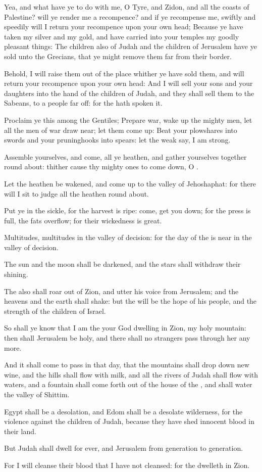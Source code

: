 \verse Yea, and what have ye to do with me, O Tyre, and Zidon, and all the coasts of Palestine? will ye render me a recompence? and if ye recompense me, swiftly and speedily will I return your recompence upon your own head; \verse Because ye have taken my silver and my gold, and have carried into your temples my goodly pleasant things: \verse The children also of Judah and the children of Jerusalem have ye sold unto the Grecians, that ye might remove them far from their border.

\verse Behold, I will raise them out of the place whither ye have sold them, and will return your recompence upon your own head: \verse And I will sell your sons and your daughters into the hand of the children of Judah, and they shall sell them to the Sabeans, to a people far off: for the \LORD hath spoken it.

\verse Proclaim ye this among the Gentiles; Prepare war, wake up the mighty men, let all the men of war draw near; let them come up: \verse Beat your plowshares into swords and your pruninghooks into spears: let the weak say, I am strong.

\verse Assemble yourselves, and come, all ye heathen, and gather yourselves together round about: thither cause thy mighty ones to come down, O \LORD.

\verse Let the heathen be wakened, and come up to the valley of Jehoshaphat: for there will I sit to judge all the heathen round about.

\verse Put ye in the sickle, for the harvest is ripe: come, get you down; for the press is full, the fats overflow; for their wickedness is great.

\verse Multitudes, multitudes in the valley of decision: for the day of the \LORD is near in the valley of decision.

\verse The sun and the moon shall be darkened, and the stars shall withdraw their shining.

\verse The \LORD also shall roar out of Zion, and utter his voice from Jerusalem; and the heavens and the earth shall shake: but the \LORD will be the hope of his people, and the strength of the children of Israel.

\verse So shall ye know that I am the \LORD your God dwelling in Zion, my holy mountain: then shall Jerusalem be holy, and there shall no strangers pass through her any more.

\verse And it shall come to pass in that day, that the mountains shall drop down new wine, and the hills shall flow with milk, and all the rivers of Judah shall flow with waters, and a fountain shall come forth out of the house of the \LORD, and shall water the valley of Shittim.

\verse Egypt shall be a desolation, and Edom shall be a desolate wilderness, for the violence against the children of Judah, because they have shed innocent blood in their land.

\verse But Judah shall dwell for ever, and Jerusalem from generation to generation.

\verse For I will cleanse their blood that I have not cleansed: for the \LORD dwelleth in Zion.

